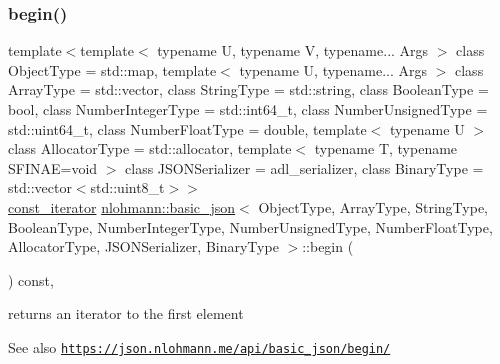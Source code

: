 \subsubsection{\texorpdfstring{begin()}{begin()}\hspace{0.1cm}{\footnotesize\ttfamily [2/2]}}
{\footnotesize\ttfamily template$<$template$<$ typename U, typename V, typename... Args $>$ class Object\+Type = std\+::map, template$<$ typename U, typename... Args $>$ class Array\+Type = std\+::vector, class String\+Type  = std\+::string, class Boolean\+Type  = bool, class Number\+Integer\+Type  = std\+::int64\+\_\+t, class Number\+Unsigned\+Type  = std\+::uint64\+\_\+t, class Number\+Float\+Type  = double, template$<$ typename U $>$ class Allocator\+Type = std\+::allocator, template$<$ typename T, typename S\+F\+I\+N\+A\+E=void $>$ class J\+S\+O\+N\+Serializer = adl\+\_\+serializer, class Binary\+Type  = std\+::vector$<$std\+::uint8\+\_\+t$>$$>$ \\
\hyperlink{classnlohmann_1_1basic__json_aebd2cfa7e4ded4e97cde9269bfeeea38}{const\+\_\+iterator} \hyperlink{classnlohmann_1_1basic__json}{nlohmann\+::basic\+\_\+json}$<$ Object\+Type, Array\+Type, String\+Type, Boolean\+Type, Number\+Integer\+Type, Number\+Unsigned\+Type, Number\+Float\+Type, Allocator\+Type, J\+S\+O\+N\+Serializer, Binary\+Type $>$\+::begin (\begin{DoxyParamCaption}{ }\end{DoxyParamCaption}) const\hspace{0.3cm}{\ttfamily [inline]}, {\ttfamily [noexcept]}}



returns an iterator to the first element 

\begin{DoxySeeAlso}{See also}
\href{https://json.nlohmann.me/api/basic_json/begin/}{\tt https\+://json.\+nlohmann.\+me/api/basic\+\_\+json/begin/} 
\end{DoxySeeAlso}
\mbox{\label{classnlohmann_1_1basic__json_a3d255dbe024ce2d0fdfb1b4837629091}} 
